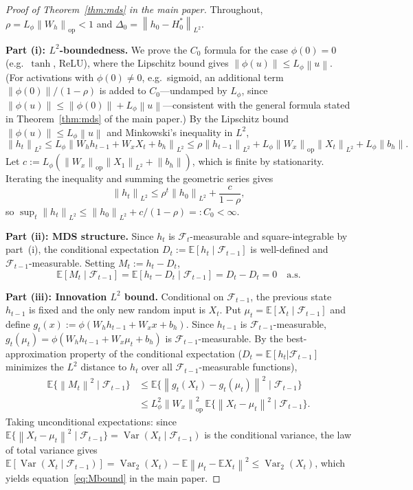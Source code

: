 \documentclass[bj,authoryear]{imsart}
\theoremstyle{plain}
\theoremstyle{definition}
\newcommand{\E}{\mathbb{E}}
\newcommand{\F}{\mathcal{F}}
\newcommand{\norm}[1]{\left\lVert #1 \right\rVert}
\newcommand{\given}{\mid}
\DeclareMathOperator{\Var}{Var}
\begin{document}
\begin{proof}[Proof of Theorem~\ref{thm:mds} in the main paper]
  Throughout, $\rho = L_\phi\norm{W_h}_{\mathrm{op}} < 1$ and
  $\Delta_0 = \norm{h_0 - H_0^*}_{L^2}$.

  \textbf{Part (i): $L^2$-boundedness.}
  We prove the $C_0$ formula for the case $\phi(0)=0$ (e.g.\ $\tanh$, ReLU),
  where the Lipschitz bound gives $\norm{\phi(u)} \leq L_\phi\norm{u}$.
  (For activations with $\phi(0)\neq 0$, e.g.\ sigmoid, an additional
  term $\norm{\phi(0)}/(1-\rho)$ is added to $C_0$---undamped by $L_\phi$,
  since $\norm{\phi(u)}\leq\norm{\phi(0)}+L_\phi\norm{u}$---consistent with the
  general formula stated in Theorem~\ref{thm:mds} of the main paper.)
  By the Lipschitz bound $\norm{\phi(u)}\leq L_\phi\norm{u}$ and
  Minkowski's inequality in $L^2$,
  \[
    \norm{h_t}_{L^2}
    \leq L_\phi\norm{W_hh_{t-1}+W_xX_t+b_h}_{L^2}
    \leq \rho\norm{h_{t-1}}_{L^2}
      + L_\phi\norm{W_x}_{\mathrm{op}}\norm{X_t}_{L^2}
      + L_\phi\norm{b_h}.
  \]
  Let $c := L_\phi(\norm{W_x}_{\mathrm{op}}\norm{X_1}_{L^2}+\norm{b_h})$,
  which is finite by stationarity.  Iterating the inequality and summing
  the geometric series gives
  \[
    \norm{h_t}_{L^2} \leq \rho^t\norm{h_0}_{L^2} + \frac{c}{1-\rho},
  \]
  so $\sup_t\norm{h_t}_{L^2} \leq \norm{h_0}_{L^2} + c/(1-\rho) =: C_0 < \infty$.

  \textbf{Part (ii): MDS structure.}
  Since $h_t$ is $\F_t$-measurable and square-integrable by part~(i),
  the conditional expectation $D_t := \E[h_t\given\F_{t-1}]$ is
  well-defined and $\F_{t-1}$-measurable.  Setting $M_t := h_t - D_t$,
  \[
    \E[M_t\given\F_{t-1}]
    = \E[h_t - D_t\given\F_{t-1}]
    = D_t - D_t = 0 \quad\text{a.s.}
  \]

  \textbf{Part (iii): Innovation $L^2$ bound.}
  Conditional on $\F_{t-1}$, the previous state $h_{t-1}$ is fixed and
  the only new random input is $X_t$.  Put $\mu_t = \E[X_t\mid\F_{t-1}]$
  and define $g_t(x) := \phi(W_h h_{t-1} + W_x x + b_h)$.
  Since $h_{t-1}$ is $\F_{t-1}$-measurable, $g_t(\mu_t) = \phi(W_hh_{t-1}+W_x\mu_t+b_h)$ is $\F_{t-1}$-measurable.
  By the best-approximation property of the conditional expectation ($D_t = \E[h_t|\F_{t-1}]$ minimizes the $L^2$ distance to $h_t$ over all $\F_{t-1}$-measurable functions),
  \begin{align*}
    \E\bigl\{\norm{M_t}^2\mid\F_{t-1}\bigr\}
    &\leq \E\bigl\{\norm{g_t(X_t) - g_t(\mu_t)}^2\mid\F_{t-1}\bigr\} \\
    &\leq L_\phi^2\norm{W_x}_{\mathrm{op}}^2\,
           \E\bigl\{\norm{X_t - \mu_t}^2\mid\F_{t-1}\bigr\}.
  \end{align*}
  Taking unconditional expectations: since
  $\E\{\norm{X_t-\mu_t}^2\mid\F_{t-1}\} = \Var(X_t\mid\F_{t-1})$ is the
  conditional variance, the law of total variance gives
  $\E[\Var(X_t\mid\F_{t-1})] = \Var_2(X_t) - \E\norm{\mu_t-\E X_t}^2
    \leq \Var_2(X_t)$,
  which yields equation~\eqref{eq:Mbound} in the main paper.


\end{proof}
\end{document}
